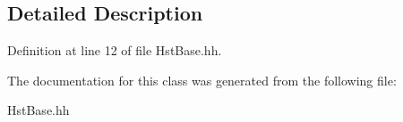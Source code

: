 \subsection{Detailed Description}


Definition at line 12 of file HstBase.hh.

The documentation for this class was generated from the following file:\begin{DoxyCompactItemize}
\item 
HstBase.hh\end{DoxyCompactItemize}
